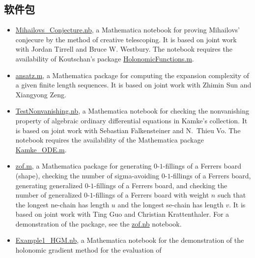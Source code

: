 \documentclass[a4paper,12pt]{article}
\begin{document}
\begin{CJK*}{UTF8}{gbsn}

\section*{\Large{软件包}}
\begin{itemize}
\item \href{https://yzhang1616.github.io/ct/Mihailovs_Conjecture.nb}{Mihailovs\_Conjecture.nb},  a Mathematica notebook for 
proving Mihailovs' conjecure by the method of creative telescoping. It is based on joint work
with Jordan Tirrell and Bruce W. Westbury.   The notebook requires the availability of Koutschan's package 
 \href{http://www.risc.jku.at/research/combinat/software/ergosum/RISC/HolonomicFunctions.html}{HolonomicFunctions.m}.
\item \href{https://yzhang1616.github.io/complexity/ansatz.m}{ansatz.m}, 
a Mathematica package for computing the expansion complexity of a given finite length sequences. 
It is based on joint work with Zhimin Sun and Xiangyong Zeng.
  \item \href{https://yzhang1616.github.io/TestNonvanishing.nb}{TestNonvanishing.nb}, 
    a Mathematica notebook for checking the nonvanishing property of algebraic ordinary
    differential equations in Kamke's collection. It is based on joint work
    with Sebastian Falkensteiner and N.\ Thieu Vo. 
    The notebook requires the availability of the Mathematica package \href{https://yzhang1616.github.io/Kamke_ODE.m}{Kamke\_ODE.m}.
  \item \href{https://yzhang1616.github.io/zof/zof.m}{zof.m}, a Mathematica package for generating $0$-$1$-fillings 
  of a Ferrers board (shape), checking the number of
    sigma-avoiding $0$-$1$-fillings of a Ferrers board, 
     generating generalized $0$-$1$-fillings of a Ferrers board, 
     and checking the number of generalized $0$-$1$-fillings of a Ferrers board with weight $n$
    such that the longest ne-chain has length $u$ 
    and the longest se-chain has length $v$. It is based on joint work with Ting
    Guo and Christian Krattenthaler. For a demonstration of the package,
    see the \href{https://yzhang1616.github.io/zof/zof.nb}{zof.nb} notebook. 
\item \href{https://yzhang1616.github.io/ec1/Example1_HGM.nb}{Example1\_HGM.nb}, a Mathematica notebook for
    the demonstration of the holonomic gradient method for the evaluation of

\end{itemize}
\end{CJK*}
\end{document}

